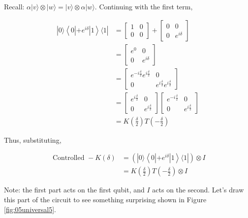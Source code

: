 \documentclass[main.tex]{subfiles}
\begin{document}
    Recall: $\alpha|v\rangle \otimes|w\rangle=|v\rangle \otimes \alpha|w\rangle$. Continuing with the first term,
    
    $$
    \begin{aligned}
    |0\rangle\left\langle 0\left|+e^{i \delta}\right| 1\right\rangle\langle 1| &=\left[\begin{array}{ll}
    1 & 0 \\
    0 & 0
    \end{array}\right]+\left[\begin{array}{cc}
    0 & 0 \\
    0 & e^{i \delta}
    \end{array}\right] \\
    &=\left[\begin{array}{cc}
    e^{0} & 0 \\
    0 & e^{i \delta}
    \end{array}\right] \\
    &=\left[\begin{array}{cc}
    e^{-i \frac{\delta}{2}} e^{i \frac{\delta}{2}} & 0 \\
    0 & e^{i \frac{\delta}{2}} e^{i \frac{\delta}{2}}
    \end{array}\right] \\
    &=\left[\begin{array}{cc}
    e^{i \frac{\delta}{2}} & 0 \\
    0 & e^{i \frac{\delta}{2}}
    \end{array}\right]\left[\begin{array}{cc}
    e^{-i \frac{\delta}{2}} & 0 \\
    0 & e^{i \frac{\delta}{2}}
    \end{array}\right] \\
    &=K\left(\frac{\delta}{2}\right) T\left(-\frac{\delta}{2}\right)
    \end{aligned}
    $$
    
    Thus, substituting,
    
    $$
    \begin{aligned}
    \text { Controlled }-K(\delta) &=\left(|0\rangle\left\langle 0\left|+e^{i \delta}\right| 1\right\rangle\langle 1|\right) \otimes I \\
    &=K\left(\frac{\delta}{2}\right) T\left(-\frac{\delta}{2}\right) \otimes I
    \end{aligned}
    $$
    
    Note: the first part acts on the first qubit, and $I$ acts on the second. Let's draw this part of the circuit to see something surprising shown in Figure \ref{fig:05universal5}.
    
\end{document}
